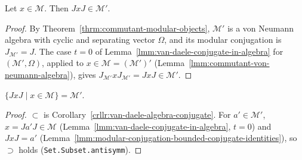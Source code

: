 \begin{corollary}
    \label{crllr:van-daele-algebra-conjugate}
    \leanok
    Let $x \in \mathcal{M}$. Then $JxJ \in \mathcal{M}'$.
\end{corollary}
\begin{proof}
    \leanok
    By Theorem~\ref{thrm:commutant-modular-objects}, $\mathcal{M}'$ is a von Neumann algebra with cyclic and separating vector $\Omega$, and its modular conjugation is $J_{\mathcal{M}'} = J$. The case $t = 0$ of Lemma~\ref{lmm:van-daele-conjugate-in-algebra} for $(\mathcal{M}', \Omega)$, applied to $x \in \mathcal{M} = (\mathcal{M}')'$ (Lemma~\ref{lmm:commutant-von-neumann-algebra}), gives $J_{\mathcal{M}'}xJ_{\mathcal{M}'} = JxJ \in \mathcal{M}'$.
\end{proof}

\begin{lemma}[$J\mathcal{M}J = \mathcal{M}'$]
    \label{lmm:tomita-modular-conjugation-commutant}
    \leanok
    $\{ JxJ \mid x \in \mathcal{M} \} = \mathcal{M}'$.
\end{lemma}
\begin{proof}
    \leanok
    $\subset$ is Corollary~\ref{crllr:van-daele-algebra-conjugate}. For $a' \in \mathcal{M}'$, $x = Ja'J \in \mathcal{M}$ (Lemma~\ref{lmm:van-daele-conjugate-in-algebra}, $t = 0$) and $JxJ = a'$ (Lemma~\ref{lmm:modular-conjugation-bounded-conjugate-identities}), so $\supset$ holds (\texttt{Set.Subset.antisymm}).
\end{proof}

